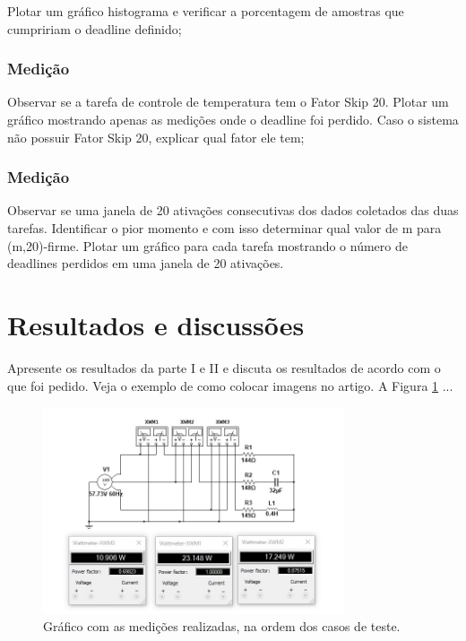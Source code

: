 \documentclass[journal]{IEEEtran}
\begin{document}
Plotar um gráfico histograma e verificar a porcentagem de amostras que cumpririam o deadline definido;

\subsubsection{Medição}

Observar se a tarefa de controle de temperatura tem o Fator Skip 20. Plotar um gráfico mostrando apenas as medições onde o deadline foi perdido. Caso o sistema não possuir Fator Skip 20, explicar qual fator ele tem;

\subsubsection{Medição}

Observar se uma janela de 20 ativações consecutivas dos dados coletados das duas tarefas. Identificar o pior momento e com isso determinar qual valor de m para (m,20)-firme. Plotar um gráfico para cada tarefa mostrando o número de deadlines perdidos em uma janela de 20 ativações.


\section{Resultados e discussões}

Apresente os resultados da parte I e II e discuta os resultados de acordo com o que foi pedido. Veja o exemplo de como colocar imagens no artigo. A Figura \ref{fig1} ...

	\begin{figure}[h]
	\centering
	\includegraphics[width=3.5in]{Imagens/medidas.jpg}	
	\caption{Gráfico com as medições realizadas, na ordem dos casos de teste.}
	\label{fig1}
\end{figure}
\end{document}
